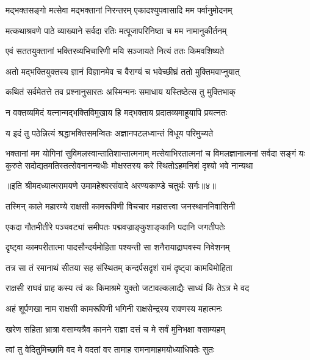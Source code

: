 \twolineshloka
{मद्भक्तसङ्गो मत्सेवा मद्भक्तानां निरन्तरम्}
{एकादश्युपवासादि मम पर्वानुमोदनम्} %

\twolineshloka
{मत्कथाश्रवणे पाठे व्याख्याने सर्वदा रतिः}
{मत्पूजापरिनिष्ठा च मम नामानुकीर्तनम्} %

\twolineshloka
{एवं सततयुक्तानां भक्तिरव्यभिचारिणी}
{मयि सञ्जायते नित्यं ततः किमवशिष्यते} %

\twolineshloka
{अतो मद्भक्तियुक्तस्य ज्ञानं विज्ञानमेव च}
{वैराग्यं च भवेच्छीघ्रं ततो मुक्तिमवाप्नुयात्} %

\twolineshloka
{कथितं सर्वमेतत्ते तव प्रश्नानुसारतः}
{अस्मिन्मनः समाधाय यस्तिष्ठेत्स तु मुक्तिभाक्} %

\twolineshloka
{न वक्तव्यमिदं यत्नान्मद्भक्तिविमुखाय हि}
{मद्भक्ताय प्रदातव्यमाहूयापि प्रयत्नतः} %

\twolineshloka
{य इदं तु पठेन्नित्यं श्रद्धाभक्तिसमन्वितः}
{अज्ञानपटलध्वान्तं विधूय परिमुच्यते} %

\fourlineindentedshloka
{भक्तानां मम योगिनां सुविमलस्वान्तातिशान्तात्मनाम्}
{मत्सेवाभिरतात्मनां च विमलज्ञानात्मनां सर्वदा}
{सङ्गं यः कुरुते सदोद्यतमतिस्तत्सेवनानन्यधीः}
{मोक्षस्तस्य करे स्थितोऽहमनिशं दृश्यो भवे नान्यथा} %

{॥इति श्रीमदध्यात्मरामयणे उमामहेश्वरसंवादे
अरण्यकाण्डे चतुर्थः सर्गः॥४॥
}





\twolineshloka
{तस्मिन् काले महारण्ये राक्षसी कामरूपिणी}
{विचचार महासत्त्वा जनस्थाननिवासिनी} %

\twolineshloka
{एकदा गौतमीतीरे पञ्चवट्यां समीपतः}
{पद्मवज्राङ्कुशाङ्कानि पदानि जगतीपतेः} %

\twolineshloka
{दृष्ट्वा कामपरीतात्मा पादसौन्दर्यमोहिता}
{पश्यन्ती सा शनैरायाद्राघवस्य निवेशनम्} %

\twolineshloka
{तत्र सा तं रमानाथं सीतया सह संस्थितम्}
{कन्दर्पसदृशं रामं दृष्ट्वा कामविमोहिता} %

\twolineshloka
{राक्षसी राघवं प्राह कस्य त्वं कः किमाश्रमे}
{युक्तो जटावल्कलाद्यैः साध्यं किं तेऽत्र मे वद} %

\twolineshloka
{अहं शूर्पणखा नाम राक्षसी कामरूपिणी}
{भगिनी राक्षसेन्द्रस्य रावणस्य महात्मनः} %

\twolineshloka
{खरेण सहिता भ्रात्रा वसाम्यत्रैव कानने}
{राज्ञा दत्तं च मे सर्वं मुनिभक्षा वसाम्यहम्} %

\twolineshloka
{त्वां तु वेदितुमिच्छामि वद मे वदतां वर}
{तामाह रामनामाहमयोध्याधिपतेः सुतः} %

